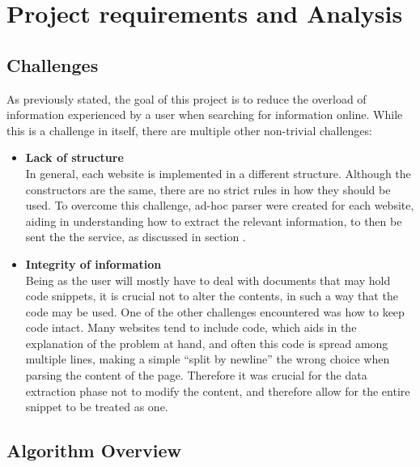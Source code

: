 \section{Project requirements and Analysis}\label{sec:requirementsAndAnalysis}


\subsection{Challenges}
As previously stated, the goal of this project is to reduce the overload of information experienced by a user when searching for information online. While this is a challenge in itself, there are multiple other non-trivial challenges:

\begin{itemize}
\item {\bf Lack of structure}\\
In general, each website is implemented in a different structure. Although the constructors are the same, there are no strict rules in how they should be used. To overcome this challenge, ad-hoc parser were created for each website, aiding in understanding how to extract the relevant information, to then be sent the the service, as discussed in section .
\item {\bf Integrity of information}\\
Being as the user will mostly have to deal with documents that may hold code snippets, it is crucial not to alter the contents, in such a way that the code may be used. One of the other challenges encountered was how to keep code intact. Many websites tend to include code, which aids in the explanation of the problem at hand, and often this code is spread among multiple lines, making a simple ``split by newline'' the wrong choice when parsing the content of the page. Therefore it was crucial for the data extraction phase not to modify the content, and therefore allow for the entire snippet to be treated as one.


\end{itemize}

\subsection{Algorithm Overview}

